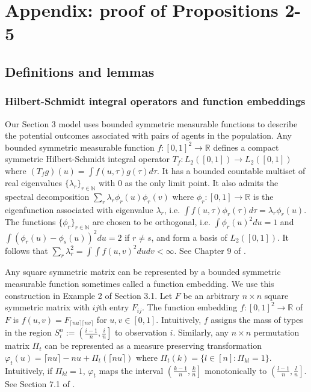 \documentclass[12pt]{article}
\renewcommand{\baselinestretch}{1.5}
\theoremstyle{definition}
\begin{document}
\renewcommand{\baselinestretch}{1.5}


\renewcommand{\baselinestretch}{1.5}

\appendix

\section{Appendix: proof of Propositions 2-5}
\subsection{Definitions and lemmas}

\subsubsection{Hilbert-Schmidt integral operators and function embeddings}
Our  Section 3 model uses bounded symmetric measurable functions to describe the potential outcomes associated with pairs of agents in the population. Any bounded symmetric measurable function $f: [0,1]^{2}\to \mathbb{R}$ defines a compact symmetric Hilbert-Schmidt integral operator $T_{f}: L_{2}([0,1]) \to L_{2}([0,1])$ where $(T_{f} g)(u) = \int f(u,\tau)g(\tau)d\tau$. It has a bounded countable multiset of real eigenvalues $\{\lambda_{r}\}_{r \in \mathbb{N}}$ with $0$ as the only limit point. It also admits the spectral decomposition $\sum_{r}\lambda_{r}\phi_{r}(u)\phi_{r}(v)$ where $\phi_{r}: [0,1] \to \mathbb{R}$ is the eigenfunction associated with eigenvalue $\lambda_{r}$, i.e. $\int f(u,\tau)\phi_{r}(\tau)d\tau = \lambda_{r}\phi_{r}(u)$. The functions $\{\phi_{r}\}_{r\in \mathbb{N}}$ are chosen to be orthogonal, i.e. $\int \phi_{r}(u)^{2}du = 1$ and $\int(\phi_{r}(u)- \phi_{s}(u))^{2}du = 2$ if $r \neq s$, and form a basis of $L_{2}([0,1])$. It follows that $\sum_{r}\lambda_{r}^{2} = \int\int f(u,v)^{2}dudv <  \infty$. See Chapter 9 of \cite{birman2012spectral}.   

Any square symmetric matrix can be represented by a bounded symmetric measurable function sometimes called a function embedding. We use this construction in Example 2 of Section 3.1. Let $F$ be an arbitrary $n\times n$ square symmetric matrix with $ij$th entry $F_{ij}$. The function embedding $f: [0,1]^{2}\to\mathbb{R}$ of $F$  is $f(u,v) = F_{\lceil nu\rceil \lceil nv\rceil}$ for $u,v \in [0,1]$. Intuitively, $f$ assigns the mass of types in the region $S_{i}^{n} := \left(\frac{i-1}{n},\frac{i}{n}\right]$ to observation $i$.  Similarly, any $n \times n$ permutation matrix $\Pi_{t}$ can be represented as a measure preserving transformation $\varphi_{t}(u) = \lceil nu \rceil - nu + \Pi_{t}(\lceil nu \rceil)$ where $\Pi_{t}(k) = \{l \in [n]: \Pi_{kl} = 1\}$. Intuitively, if $\Pi_{kl} = 1$, $\varphi_{t}$ maps the interval $\left(\frac{k-1}{n},\frac{k}{n}\right]$ monotonically to $\left(\frac{l-1}{n},\frac{l}{n}\right]$. See Section 7.1 of \cite{lovasz2012large}.   
 
\end{document}
